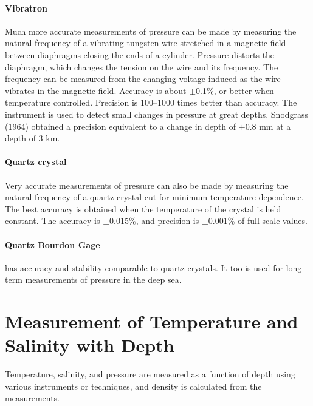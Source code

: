 \paragraph{Vibratron} Much more accurate measurements of pressure can be
made by
measuring the natural frequency of a vibrating tungsten wire
stretched in a magnetic field between diaphragms closing the ends
of a cylinder. Pressure distorts the diaphragm, which changes the
tension on the wire and its frequency. The frequency can be
measured from the changing voltage induced as the wire vibrates in
the magnetic field.  Accuracy is about $\pm$0.1\%, or better when
temperature controlled. Precision is 100--1000 times better than
accuracy. The instrument is used to detect small changes in
pressure at great depths. Snodgrass (1964) obtained a precision
equivalent to a change in depth of $\pm$0.8 mm at a depth of 3 km.

\paragraph{Quartz crystal} Very accurate measurements of pressure can also
be made by measuring
the natural frequency of a quartz crystal cut for minimum
temperature dependence. The best accuracy is obtained when the
temperature of the crystal is held constant. The accuracy is
$\pm$0.015\%, and precision is $\pm$0.001\% of full-scale values.

\paragraph{Quartz Bourdon Gage} has accuracy and stability comparable
to
quartz
crystals. It too is used for long-term measurements of pressure in
the deep sea.

\section[Temperature and Salinity With Depth]{Measurement of Temperature and
Salinity with Depth}  Temperature,
salinity, and pressure are measured as a function of depth using
various instruments or techniques, and density is calculated from
the measurements.

